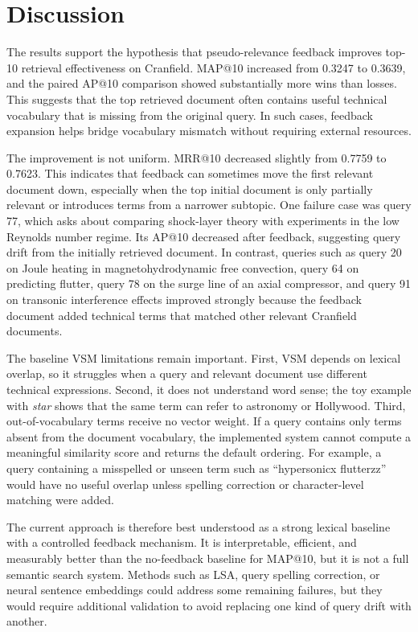 \section{Discussion}\label{sec:discuss}

The results support the hypothesis that pseudo-relevance feedback improves
top-10 retrieval effectiveness on Cranfield. MAP@10 increased from 0.3247 to
0.3639, and the paired AP@10 comparison showed substantially more wins than
losses. This suggests that the top retrieved document often contains useful
technical vocabulary that is missing from the original query. In such cases,
feedback expansion helps bridge vocabulary mismatch without requiring external
resources.

The improvement is not uniform. MRR@10 decreased slightly from 0.7759 to 0.7623.
This indicates that feedback can sometimes move the first relevant document
down, especially when the top initial document is only partially relevant or
introduces terms from a narrower subtopic. One failure case was query 77, which
asks about comparing shock-layer theory with experiments in the low Reynolds
number regime. Its AP@10 decreased after feedback, suggesting query drift from
the initially retrieved document. In contrast, queries such as query 20 on Joule
heating in magnetohydrodynamic free convection, query 64 on predicting flutter,
query 78 on the surge line of an axial compressor, and query 91 on transonic
interference effects improved strongly because the feedback document added
technical terms that matched other relevant Cranfield documents.

The baseline VSM limitations remain important. First, VSM depends on lexical
overlap, so it struggles when a query and relevant document use different
technical expressions. Second, it does not understand word sense; the toy
example with \emph{star} shows that the same term can refer to astronomy or
Hollywood. Third, out-of-vocabulary terms receive no vector weight. If a query
contains only terms absent from the document vocabulary, the implemented system
cannot compute a meaningful similarity score and returns the default ordering.
For example, a query containing a misspelled or unseen term such as
``hypersonicx flutterzz'' would have no useful overlap unless spelling
correction or character-level matching were added.

The current approach is therefore best understood as a strong lexical baseline
with a controlled feedback mechanism. It is interpretable, efficient, and
measurably better than the no-feedback baseline for MAP@10, but it is not a full
semantic search system. Methods such as LSA, query spelling correction, or
neural sentence embeddings could address some remaining failures, but they
would require additional validation to avoid replacing one kind of query drift
with another.
